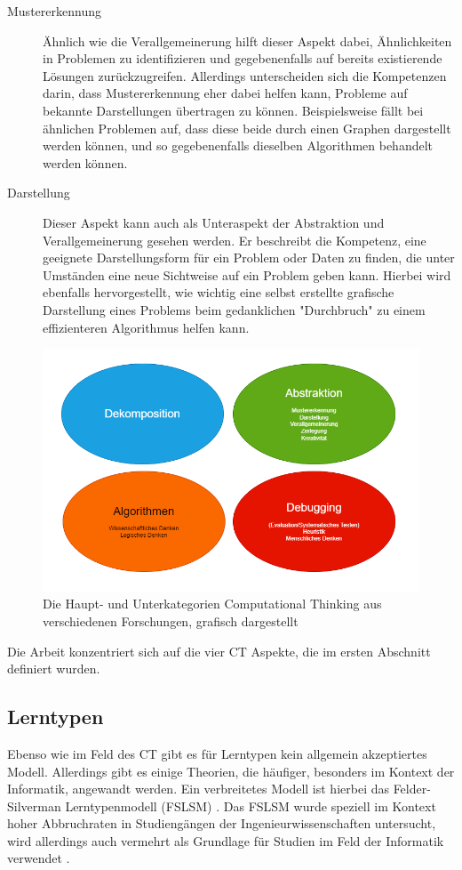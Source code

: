 \begin{description}
    \item[Mustererkennung] Ähnlich wie die Verallgemeinerung hilft dieser Aspekt dabei, Ähnlichkeiten in Problemen zu identifizieren und gegebenenfalls auf bereits existierende Lösungen zurückzugreifen. Allerdings unterscheiden sich die Kompetenzen darin, dass Mustererkennung eher dabei helfen kann, Probleme auf bekannte Darstellungen übertragen zu können. Beispielsweise fällt bei ähnlichen Problemen auf, dass diese beide durch einen Graphen dargestellt werden können, und so gegebenenfalls dieselben Algorithmen behandelt werden können.
    \item[Darstellung] Dieser Aspekt kann auch als Unteraspekt der Abstraktion und Verallgemeinerung gesehen werden. Er beschreibt die Kompetenz, eine geeignete Darstellungsform für ein Problem oder Daten zu finden, die unter Umständen eine neue Sichtweise auf ein Problem geben kann. Hierbei wird ebenfalls hervorgestellt, wie wichtig eine selbst erstellte grafische Darstellung eines Problems beim gedanklichen "Durchbruch" zu einem effizienteren Algorithmus helfen kann.
\end{description}

\begin{figure}[H]
    \centering
    \includegraphics[width=1\linewidth]{Figures/Section_2/CT}
    \caption{Die Haupt- und Unterkategorien Computational Thinking aus verschiedenen Forschungen, grafisch dargestellt}
\end{figure}

Die Arbeit konzentriert sich auf die vier CT Aspekte, die im ersten Abschnitt definiert wurden.

\subsection{Lerntypen}
Ebenso wie im Feld des CT gibt es für Lerntypen kein allgemein akzeptiertes Modell. Allerdings gibt es einige Theorien, die häufiger, besonders im Kontext der Informatik, angewandt werden. Ein verbreitetes Modell ist hierbei das Felder-Silverman Lerntypenmodell (FSLSM) \cite{felder}. 
Das FSLSM wurde speziell im Kontext hoher Abbruchraten in Studiengängen der Ingenieurwissenschaften untersucht, wird allerdings auch vermehrt als Grundlage für Studien im Feld der Informatik verwendet \cite{kumar}.

